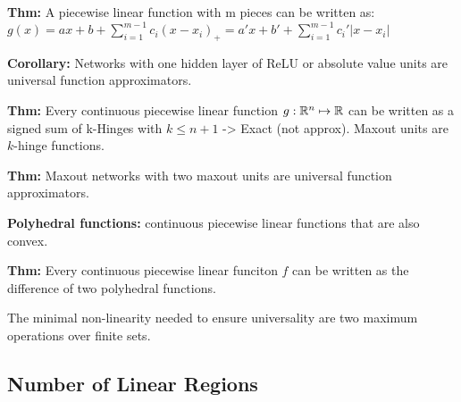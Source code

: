 \textbf{Thm:} A piecewise linear function with m pieces can be written as: $g(x) = ax+b + \sum_{i=1}^{m-1}c_i(x-x_i)_+ = a'x+b'+\sum_{i=1}^{m-1}c_i'|x-x_i|$

\textbf{Corollary: } Networks with one hidden layer of ReLU or absolute value units are universal function approximators.

\textbf{Thm:} Every continuous piecewise linear function $g: \mathbb{R}^n \mapsto \mathbb{R}$ can be written as a signed sum of k-Hinges with $k\leq n+1$ -> Exact (not approx). Maxout units are $k$-hinge functions.

\textbf{Thm:} Maxout networks with two maxout units are universal function approximators.

\textbf{Polyhedral functions:} continuous piecewise linear functions that are also convex.

\textbf{Thm:} Every continuous piecewise linear funciton $f$ can be written as the difference of two polyhedral functions.

The minimal non-linearity needed to ensure universality are two maximum operations over finite sets.

\subsection*{Number of Linear Regions}
